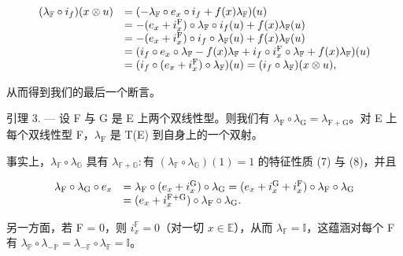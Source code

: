\[
\begin{array}{r l} (\lambda_ {\mathbb {F}} \circ i _ {f}) (x \otimes u) & = (- \lambda_ {\mathbb {F}} \circ e _ {x} \circ i _ {f} + f (x) \lambda_ {\mathbb {F}}) (u) \\ & = - (e _ {x} + i _ {x} ^ {\mathrm{F}}) \circ \lambda_ {\mathbb {F}} \circ i _ {f} (u) + f (x) \lambda_ {\mathbb {F}} (u) \\ & = - (e _ {x} + i _ {x} ^ {\mathrm{F}}) \circ i _ {f} \circ \lambda_ {\mathbb {F}} (u) + f (x) \lambda_ {\mathbb {F}} (u) \\ & = (i _ {f} \circ e _ {x} \circ \lambda_ {\mathbb {F}} - f (x) \lambda_ {\mathbb {F}} + i _ {f} \circ i _ {x} ^ {\mathrm{F}} \circ \lambda_ {\mathbb {F}} + f (x) \lambda_ {\mathbb {F}}) (u) \\ & = (i _ {f} \circ (e _ {x} + i _ {x} ^ {\mathrm{F}}) \circ \lambda_ {\mathbb {F}}) (u) = (i _ {f} \circ \lambda_ {\mathbb {F}}) (x \otimes u), \end{array}
\]

  从而得到我们的最后一个断言。

引理 3. --- 设 F 与 G 是 E 上两个双线性型。则我们有 \(\lambda_{\mathrm{F}} \circ \lambda_{\mathrm{G}} = \lambda_{\mathrm{F+G}}\)。对 E 上每个双线性型 F，\(\lambda_{\mathrm{F}}\) 是 T(E) 到自身上的一个双射。

  事实上，\(\lambda_{\mathbb{F}} \circ \lambda_{\mathbb{G}}\) 具有 \(\lambda_{\mathbb{F} + \mathbb{G}}: \text{有 } (\lambda_{\mathbb{F}} \circ \lambda_{\mathbb{G}})(1) = 1\) 的特征性质 (7) 与 (8)，并且

\[
\begin{array}{r l} \lambda_ {\mathrm{F}} \circ \lambda_ {\mathrm{G}} \circ e _ {x} & = \lambda_ {\mathrm{F}} \circ (e _ {x} + i _ {x} ^ {\mathrm{G}}) \circ \lambda_ {\mathrm{G}} = (e _ {x} + i _ {x} ^ {\mathrm{G}} + i _ {x} ^ {\mathrm{F}}) \circ \lambda_ {\mathrm{F}} \circ \lambda_ {\mathrm{G}} \\ & = (e _ {x} + i _ {x} ^ {\mathrm{F+G}}) \circ \lambda_ {\mathrm{F}} \circ \lambda_ {\mathrm{G}}. \end{array}
\]

  另一方面，若 F = 0，则 \(i_x^{\mathbb{F}} = 0\)（对一切 \(x \in \mathbb{E}\)），从而 \(\lambda_{\mathbb{F}} = \mathbb{I}\)，这蕴涵对每个 F 有 \(\lambda_{\mathbb{P}} \circ \lambda_{-\mathbb{P}} = \lambda_{-\mathbb{F}} \circ \lambda_{\mathbb{F}} = \mathbb{I}\)。

